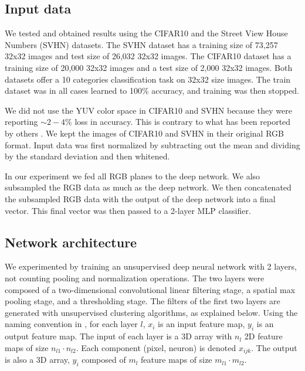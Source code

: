 \documentclass{article} %
\begin{document}
\subsection{Input data}

We tested and obtained results using the CIFAR10 \cite{krizhevsky_learning_2009} and the Street View House Numbers (SVHN) \cite{netzer_reading_2011} datasets.
The SVHN dataset has a training size of 73,257 32x32 images and test size of 26,032 32x32 images.
The CIFAR10 dataset has a training size of 20,000 32x32 images and a test size of 2,000 32x32 images.
Both datasets offer a 10 categories classification task on 32x32 size images.
The train dataset was in all cases learned to 100\% accuracy, and training was then stopped. 

We did not use the YUV color space in CIFAR10 and SVHN because they were reporting $\sim 2-4\%$ loss in accuracy.
This is contrary to what has been reported by others \cite{jarrett_what_2009}.
We kept the images of CIFAR10 and SVHN in their original RGB format.
Input data was first normalized by subtracting out the mean and dividing by the standard deviation and then whitened.

In our experiment we fed all RGB planes to the deep network.
We also subsampled the RGB data as much as the deep network.
We then concatenated the subsampled RGB data with the output of the deep network into a final vector.
This final vector was then passed to a 2-layer MLP classifier.

\subsection{Network architecture}
\label{sec-net-arch}

We experimented by training an unsupervised deep neural network with 2 layers, not counting pooling and normalization operations.
The two layers were composed of a two-dimensional convolutional linear filtering stage, a spatial max pooling stage, and a thresholding stage. 
The filters of the first two layers are generated with unsupervised clustering algorithms, as explained below. 
Using the naming convention in \cite{lecun_convolutional_2010}, for each layer $l$, $x_i$ is an input feature map, $y_i$ is an output feature map.
The input of each layer is a 3D array with $n_l$ 2D feature maps of size $n_{l1} \cdot n_{l2}$.
Each component (pixel, neuron) is denoted $x_{ijk}$.
The output is also a 3D array, $y_i$ composed of $m_l$ feature maps of size $m_{l1} \cdot m_{l2}$.
\end{document}
